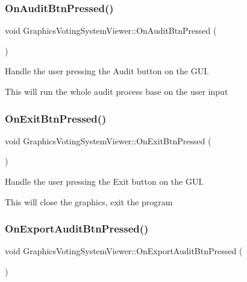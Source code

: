 \subsubsection{\texorpdfstring{On\+Audit\+Btn\+Pressed()}{OnAuditBtnPressed()}}
{\footnotesize\ttfamily void Graphics\+Voting\+System\+Viewer\+::\+On\+Audit\+Btn\+Pressed (\begin{DoxyParamCaption}{ }\end{DoxyParamCaption})}



Handle the user pressing the Audit button on the G\+UI. 

This will run the whole audit process base on the user input \mbox{\label{classGraphicsVotingSystemViewer_ae700ed298fe5037131a85e73af208938}} 
\subsubsection{\texorpdfstring{On\+Exit\+Btn\+Pressed()}{OnExitBtnPressed()}}
{\footnotesize\ttfamily void Graphics\+Voting\+System\+Viewer\+::\+On\+Exit\+Btn\+Pressed (\begin{DoxyParamCaption}{ }\end{DoxyParamCaption})}



Handle the user pressing the Exit button on the G\+UI. 

This will close the graphics, exit the program \mbox{\label{classGraphicsVotingSystemViewer_abfe9cdae267e421f59b05e2e1c076778}} 
\subsubsection{\texorpdfstring{On\+Export\+Audit\+Btn\+Pressed()}{OnExportAuditBtnPressed()}}
{\footnotesize\ttfamily void Graphics\+Voting\+System\+Viewer\+::\+On\+Export\+Audit\+Btn\+Pressed (\begin{DoxyParamCaption}{ }\end{DoxyParamCaption})}



